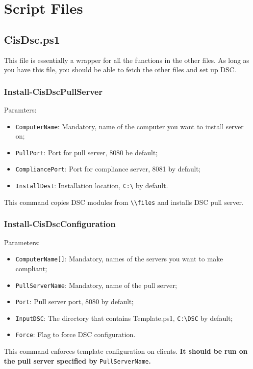 \chapter{Script Files}
\label{overview}

  \section{CisDsc.ps1}
    This file is essentially a wrapper for all the functions in the other files. As long as you have this file, you should be able to fetch the other files and set up DSC.
    \subsection{Install-CisDscPullServer}
      Paramters:
      \begin{itemize}
        \item \verb^ComputerName^: Mandatory, name of the computer you want to install server on;
        \item \verb^PullPort^: Port for pull server, 8080 be default;
        \item \verb^CompliancePort^: Port for compliance server, 8081 by default;
        \item \verb^InstallDest^: Installation location, \verb^C:\^ by default.
      \end{itemize}
      This command copies DSC modules from \verb^\\files^ and installs DSC pull server.
    \subsection{Install-CisDscConfiguration}
      Parameters:
      \begin{itemize}
        \item \verb^ComputerName[]^: Mandatory, names of the servers you want to make compliant;
        \item \verb^PullServerName^: Mandatory, name of the pull server;
        \item \verb^Port^: Pull server port, 8080 by default;
        \item \verb^InputDSC^: The directory that contains Template.ps1, \verb^C:\DSC^ by default;
        \item \verb^Force^: Flag to force DSC configuration.
      \end{itemize}
      This command enforces template configuration on clients. \textbf{It should be run on the pull server specified by }\verb^PullServerName^\textbf{.}
